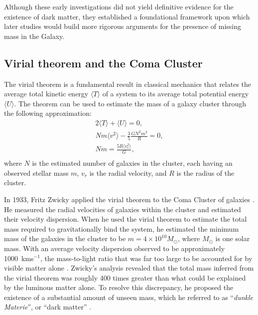 Although these early investigations did not yield definitive evidence for the existence of dark matter, they established a foundational framework upon which later studies would build more rigorous arguments for the presence of missing mass in the Galaxy.

\subsection{Virial theorem and the Coma Cluster}\label{sec:DMOverview/ViralTheorem}
The virial theorem is a fundamental result in classical mechanics that relates the average total kinetic energy $\langle T \rangle$ of a system to its average total potential energy $\langle U \rangle$. The theorem can be used to estimate the mass of a galaxy cluster through the following approximation:
\begin{equation}
\begin{split}
2\langle T \rangle + \langle U \rangle = 0, \\
Nm\langle v^2\rangle - \frac{3}{5}\frac{GN^2m^2}{R}=0,\\
Nm=\frac{5R\langle v_r^2 \rangle}{G},\\
\end{split}
\label{eq:DMOverview/virial}
\end{equation}
where $N$ is the estimated number of galaxies in the cluster, each having an observed stellar mass $m$, $v_r$ is the radial velocity, and $R$ is the radius of the cluster.

In 1933, Fritz Zwicky applied the virial theorem to the Coma Cluster of galaxies \cite{Zwicky1933}. He measured the radial velocities of galaxies within the cluster and estimated their velocity dispersion. When he used the virial theorem to estimate the total mass required to gravitationally bind the system, he estimated the minimum mass of the galaxies in the cluster to be $m=4\times 10^{10}M_{\odot}$, where $M_{\odot}$ is one solar mass. With an average velocity dispersion observed to be approximately 1000~kms$^{-1}$, the mass-to-light ratio that was far too large to be accounted for by visible matter alone \cite{HistoryofDM}. Zwicky’s analysis revealed that the total mass inferred from the virial theorem was roughly 400 times greater than what could be explained by the luminous matter alone. To resolve this discrepancy, he proposed the existence of a substantial amount of unseen mass, which he referred to as ``\textit{dunkle Materie}'', or “dark matter” \cite{Zwicky1933}.

